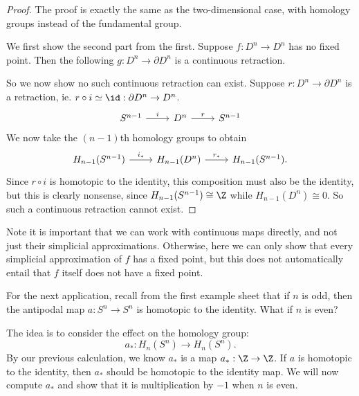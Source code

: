 \documentclass[a4paper]{article}
\begin{document}
\begin{proof}
  The proof is exactly the same as the two-dimensional case, with homology groups instead of the fundamental group.

  We first show the second part from the first. Suppose $f: D^n \to D^n$ has no fixed point. Then the following $g: D^n \to \partial D^n$ is a continuous retraction.
  \begin{center}
  \end{center}
  So we now show no such continuous retraction can exist. Suppose $r: D^n \to \partial D^n$ is a retraction, ie. $r \circ i \simeq \id: \partial D^n \to D^n$.
  \[
    \begin{tikzcd}
      S^{n - 1} \ar[r, "i"] & D^n \ar[r, "r"] & S^{n - 1}
    \end{tikzcd}
  \]
  We now take the $(n - 1)$th homology groups to obtain
  \[
    \begin{tikzcd}
      H_{n - 1}(S^{n - 1}) \ar[r, "i_*"] & H_{n - 1}(D^{n}) \ar[r, "r_*"] & H_{n - 1}(S^{n - 1}).
    \end{tikzcd}
  \]
  Since $r \circ i$ is homotopic to the identity, this composition must also be the identity, but this is clearly nonsense, since $H_{n - 1}(S^{n - 1}) \cong \Z$ while $H_{n - 1}(D^n) \cong 0$. So such a continuous retraction cannot exist.
\end{proof}
Note it is important that we can work with continuous maps directly, and not just their simplicial approximations. Otherwise, here we can only show that every simplicial approximation of $f$ has a fixed point, but this does not automatically entail that $f$ itself does not have a fixed point.

For the next application, recall from the first example sheet that if $n$ is odd, then the antipodal map $a: S^n \to S^n$ is homotopic to the identity. What if $n$ is even?

The idea is to consider the effect on the homology group:
\[
  a_*: H_n(S^n) \to H_n(S^n).
\]
By our previous calculation, we know $a_*$ is a map $a_*: \Z \to \Z$. If $a$ is homotopic to the identity, then $a_*$ should be homotopic to the identity map. We will now compute $a_*$ and show that it is multiplication by $-1$ when $n$ is even.
\end{document}
